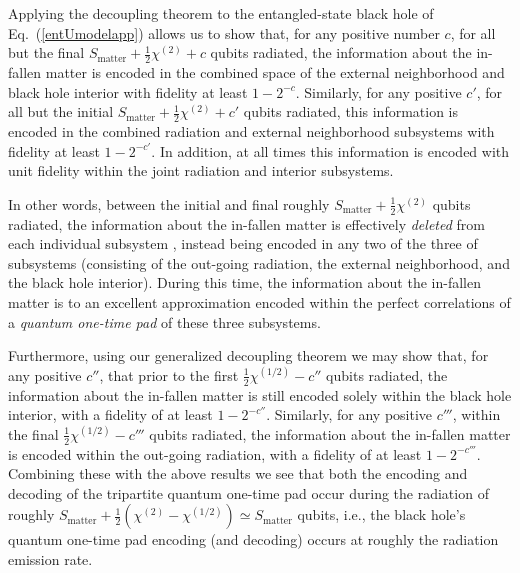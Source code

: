 \documentclass[aps,showpacs,prl,12pt]{revtex4}
\begin{document}
Applying the decoupling theorem \cite{Abey06app} to the entangled-state
black hole of Eq.~(\ref{entUmodelapp}) allows us to show that, for any
positive number $c$, for all but the final
$S_{\text{matter}}+\frac{1}{2}\chi^{(2)}+c$ qubits radiated, the
information about the in-fallen matter is encoded in the combined space
of the external neighborhood and black hole interior with fidelity
at least $1-2^{-c}$. Similarly, for any positive $c'$, for all
but the initial $S_{\text{matter}}+\frac{1}{2}\chi^{(2)}+c'$ qubits
radiated, this information is encoded in the combined radiation and
external neighborhood subsystems with fidelity at least $1-2^{-c'}$.
In addition, at all times this information is encoded with unit
fidelity within the joint radiation and interior subsystems.

In other words, between the initial and final roughly
$S_{\text{matter}}+\frac{1}{2}\chi^{(2)}$ qubits radiated, the
information about the in-fallen matter is effectively {\it deleted\/}
from each individual subsystem \cite{meapp,Kretschmannapp}, instead
being encoded in any two of the three of subsystems (consisting of
the out-going radiation, the external neighborhood, and the black
hole interior). During this time, the information about the
in-fallen matter is to an excellent approximation encoded within
the perfect correlations of a {\it quantum one-time pad}
\cite{Leung02app,meapp} of these three subsystems.

Furthermore, using our generalized decoupling theorem we may show that,
for any positive $c''$, that prior to the first
$\frac{1}{2}\chi^{(1/2)} -c''$ qubits radiated,
the information about the in-fallen matter is still encoded solely
within the black hole interior, with a fidelity of at least
$1-2^{-c''}$. Similarly, for any positive $c'''$, within the final
$\frac{1}{2}\chi^{(1/2)} -c'''$ qubits radiated, the information about
the in-fallen matter is encoded within the out-going radiation,
with a fidelity of at least $1-2^{-c'''}$. Combining these with the
above results we see that both the encoding and decoding of the
tripartite quantum one-time pad occur during the radiation of roughly
$S_{\text{matter}}+\frac{1}{2}(\chi^{(2)}-\chi^{(1/2)})
\simeq S_{\text{matter}}$ qubits, i.e., the black hole's quantum
one-time pad encoding (and decoding) occurs at roughly the radiation
emission rate.
\end{document}
